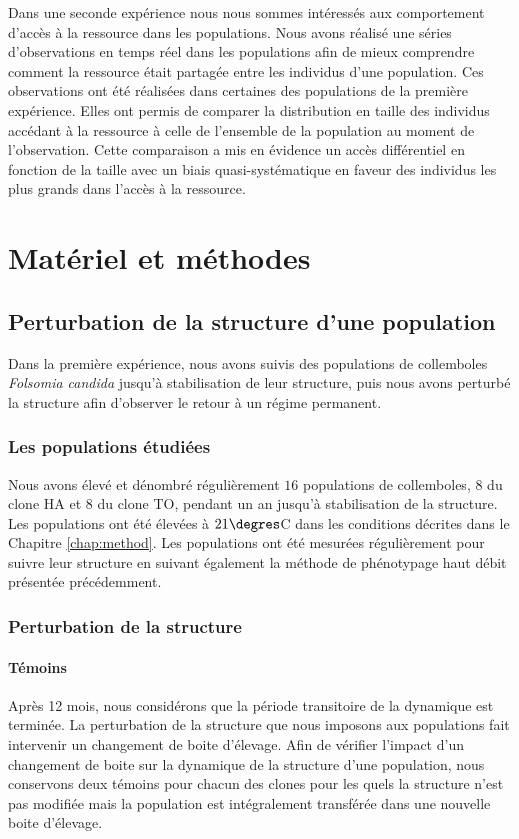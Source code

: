 Dans une seconde expérience nous nous sommes intéressés aux comportement d'accès
à la ressource dans les populations. Nous avons réalisé une séries
d'observations en temps réel dans les populations afin de mieux comprendre
comment la ressource était partagée entre les individus d'une population. Ces
observations ont été réalisées dans certaines des populations de la première
expérience. Elles ont permis de comparer la distribution en taille des individus
accédant à la ressource à celle de l'ensemble de la population au moment de
l'observation. Cette comparaison a mis en évidence un accès différentiel en
fonction de la taille avec un biais quasi-systématique en faveur des individus
les plus grands dans l'accès à la ressource. 

\section{Matériel et méthodes}

\subsection{Perturbation de la structure d'une population}

Dans la première expérience, nous avons suivis des populations de collemboles
\textit{Folsomia candida} jusqu'à stabilisation de leur structure, puis nous
avons perturbé la structure afin d'observer le retour à un régime permanent. 

\subsubsection{Les populations étudiées}

Nous avons élevé et dénombré régulièrement $16$ populations de collemboles, $8$
du clone HA et $8$ du clone TO, pendant un an jusqu'à stabilisation de la
structure. Les populations ont été élevées à $21\degres$C dans les conditions
décrites dans le Chapitre \ref{chap:method}. Les populations ont été mesurées
régulièrement pour suivre leur structure en suivant également la méthode de
phénotypage haut débit présentée précédemment.

\subsubsection{Perturbation de la structure}

\paragraph{Témoins} Après 12 mois, nous considérons que la période transitoire
de la dynamique est terminée. La perturbation de la structure que nous imposons
aux populations fait intervenir un changement de boite d'élevage. Afin de
vérifier l'impact d'un changement de boite sur la dynamique de la structure
d'une population, nous conservons deux témoins pour chacun des clones pour les
quels la structure n'est pas modifiée mais la population est intégralement
transférée dans une nouvelle boite d'élevage.

